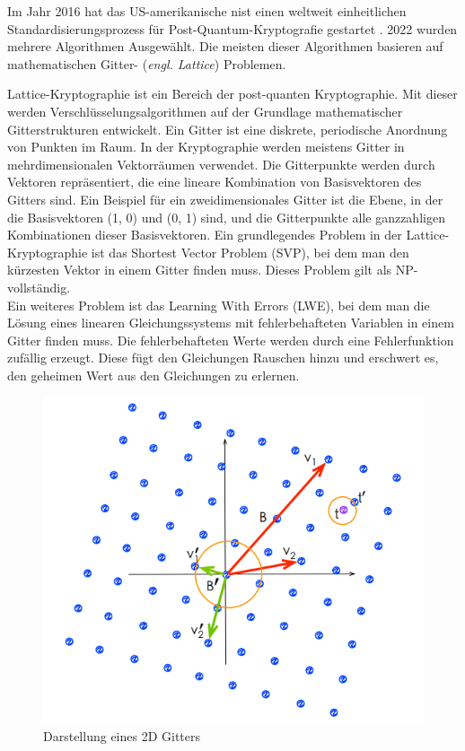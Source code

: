 Im Jahr 2016 hat das US-amerikanische \ac{nist} einen weltweit einheitlichen Standardisierungsprozess für Post-Quantum-Kryptografie gestartet \cite{moody_status_2022}.
2022 wurden mehrere Algorithmen Ausgewählt. Die meisten dieser Algorithmen basieren auf mathematischen Gitter- (\textit{engl. Lattice}) Problemen.

Lattice-Kryptographie \cite{micciancio_lattice-based_nodate} ist ein Bereich der post-quanten Kryptographie. 
Mit dieser werden Verschlüsselungsalgorithmen auf der Grundlage mathematischer Gitterstrukturen entwickelt. 
Ein Gitter ist eine diskrete, periodische Anordnung von Punkten im Raum. In der Kryptographie werden meistens Gitter in mehrdimensionalen Vektorräumen verwendet.
Die Gitterpunkte werden durch Vektoren repräsentiert, die eine lineare Kombination von Basisvektoren des Gitters sind. 
Ein Beispiel für ein zweidimensionales Gitter ist die Ebene, in der die Basisvektoren (1, 0) und (0, 1) sind, 
und die Gitterpunkte alle ganzzahligen Kombinationen dieser Basisvektoren.
Ein grundlegendes Problem in der Lattice-Kryptographie ist das Shortest Vector Problem (SVP), bei dem man den kürzesten Vektor in einem Gitter finden muss. 
Dieses Problem gilt als NP-vollständig. \cite[Abs. 2.1]{wang_lattice-based_2023}\\

Ein weiteres Problem ist das Learning With Errors (LWE), bei dem man die Lösung eines linearen Gleichungssystems mit fehlerbehafteten Variablen in einem Gitter finden muss.
Die fehlerbehafteten Werte werden durch eine Fehlerfunktion zufällig erzeugt. 
Diese fügt den Gleichungen Rauschen hinzu und erschwert es, den geheimen Wert aus den Gleichungen zu erlernen. 

\begin{figure}[h]
    \begin{center}
        \includegraphics[width=\columnwidth]{./images/lattice.PNG}
    \end{center}
    \caption{
        Darstellung eines 2D Gitters \\ 
        \cite[Fig. 2]{xu_lighting_2018}
    }
    \label{fig:Darstellung eines 2D Gitters}
\end{figure}

